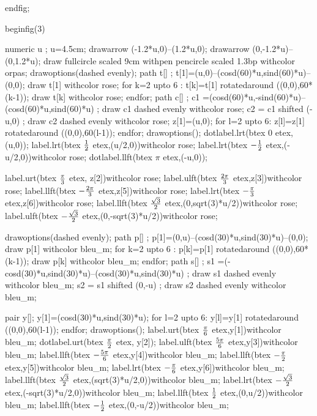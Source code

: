 \documentclass[12pt]{article}
\begin{document}
 endfig;

beginfig(3)



numeric u ;
u=4.5cm;
drawarrow (-1.2*u,0)--(1.2*u,0);
drawarrow (0,-1.2*u)--(0,1.2*u);
draw fullcircle scaled 9cm withpen pencircle scaled 1.3bp withcolor orpas;
drawoptions(dashed evenly);
path t[] ;
t[1]=(u,0)--(cosd(60)*u,sind(60)*u)--(0,0);
draw t[1] withcolor rose;
for k=2 upto 6 : t[k]=t[1] rotatedaround ((0,0),60*(k-1));
  draw t[k] withcolor rose;
endfor;
path c[] ;
c1 =(cosd(60)*u,-sind(60)*u)--(cosd(60)*u,sind(60)*u) ;
draw c1 dashed evenly withcolor rose;
c2 = c1 shifted (-u,0) ;
draw c2 dashed evenly withcolor rose;
z[1]=(u,0);
for l=2 upto 6:
  z[l]=z[1] rotatedaround ((0,0),60(l-1));
endfor;
drawoptions();
dotlabel.lrt(btex $0$ etex,(u,0));
label.lrt(btex $1 \over2$ etex,(u/2,0))withcolor rose;
label.lrt(btex $- {1 \over 2}$ etex,(-u/2,0))withcolor rose;
dotlabel.llft(btex $\pi$ etex,(-u,0));

label.urt(btex {${\pi \over 3}$} etex, z[2])withcolor rose;
label.ulft(btex {${2\pi \over 3}$} etex,z[3])withcolor rose;
label.llft(btex {$-{2\pi \over 3}$} etex,z[5])withcolor rose;
label.lrt(btex {$-{\pi \over 3}$} etex,z[6])withcolor rose;
label.llft(btex ${\sqrt{3} \over 2}$ etex,(0,sqrt(3)*u/2))withcolor rose;
label.ulft(btex $-{\sqrt{3} \over 2}$ etex,(0,-sqrt(3)*u/2))withcolor rose;

drawoptions(dashed evenly);
path p[] ;
p[1]=(0,u)--(cosd(30)*u,sind(30)*u)--(0,0);
draw p[1] withcolor  bleu_m;
for k=2 upto 6 : p[k]=p[1] rotatedaround ((0,0),60*(k-1));
  draw p[k] withcolor bleu_m;
endfor;
path s[] ;
s1 =(-cosd(30)*u,sind(30)*u)--(cosd(30)*u,sind(30)*u) ;
draw s1 dashed evenly withcolor  bleu_m;
s2 = s1 shifted (0,-u) ;
draw s2 dashed evenly withcolor bleu_m;

pair y[];
y[1]=(cosd(30)*u,sind(30)*u);
for l=2 upto 6:
  y[l]=y[1] rotatedaround ((0,0),60(l-1));
endfor;
drawoptions();
label.urt(btex ${\pi \over 6}$ etex,y[1])withcolor bleu_m;
dotlabel.urt(btex ${\pi \over 2}$ etex, y[2]);
label.ulft(btex ${5\pi \over 6}$ etex,y[3])withcolor bleu_m;
label.llft(btex $-{5\pi \over 6}$ etex,y[4])withcolor bleu_m;
label.llft(btex $-{\pi \over 2}$ etex,y[5])withcolor bleu_m;
label.lrt(btex $-{\pi \over 6}$ etex,y[6])withcolor bleu_m;
label.llft(btex ${\sqrt{3} \over 2}$ etex,(sqrt(3)*u/2,0))withcolor bleu_m;
label.lrt(btex $-{\sqrt{3} \over 2}$ etex,(-sqrt(3)*u/2,0))withcolor bleu_m;
label.llft(btex ${1 \over 2}$ etex,(0,u/2))withcolor bleu_m;
label.llft(btex $-{1 \over 2}$ etex,(0,-u/2))withcolor bleu_m;
\end{document}
